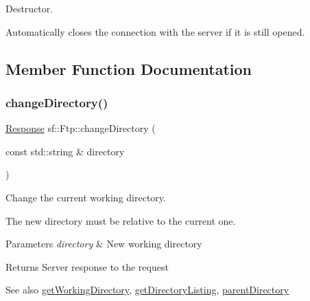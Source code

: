 Destructor. 

Automatically closes the connection with the server if it is still opened. \begin{DoxyVerb}\end{DoxyVerb}
 

\subsection{Member Function Documentation}
\mbox{\label{classsf_1_1_ftp_a7e93488ea6330dd4dd76e428da9bb6d3}} 
\subsubsection{\texorpdfstring{changeDirectory()}{changeDirectory()}}
{\footnotesize\ttfamily \mbox{\hyperlink{classsf_1_1_ftp_1_1_response}{Response}} sf\+::\+Ftp\+::change\+Directory (\begin{DoxyParamCaption}\item[{const std\+::string \&}]{directory }\end{DoxyParamCaption})}



Change the current working directory. 

The new directory must be relative to the current one.


\begin{DoxyParams}{Parameters}
{\em directory} & New working directory\\
\hline
\end{DoxyParams}
\begin{DoxyReturn}{Returns}
Server response to the request
\end{DoxyReturn}
\begin{DoxySeeAlso}{See also}
\mbox{\hyperlink{classsf_1_1_ftp_a79c654fcdd0c81e68c4fa29af3b45e0c}{get\+Working\+Directory}}, \mbox{\hyperlink{classsf_1_1_ftp_a8f37258e461fcb9e2a0655e9df0be4a0}{get\+Directory\+Listing}}, \mbox{\hyperlink{classsf_1_1_ftp_ad295cf77f30f9ad07b5c401fd9849189}{parent\+Directory}} \begin{DoxyVerb}\end{DoxyVerb}
 
\end{DoxySeeAlso}
\mbox{\label{classsf_1_1_ftp_af02fb3de3f450a50a27981961c69c860}} 

